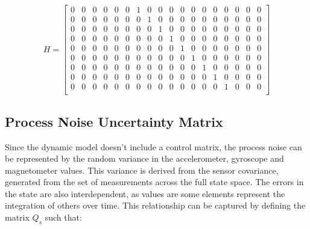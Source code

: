 \documentclass[12pt]{article}
\begin{document}
\begin{equation}
    H  = \begin{bmatrix}
        0 & 0 & 0 & 0 & 0 & 0 & 1 & 0 & 0 & 0 & 0 & 0 & 0 & 0 & 0 & 0 & 0 & 0 \\
        0 & 0 & 0 & 0 & 0 & 0 & 0 & 1 & 0 & 0 & 0 & 0 & 0 & 0 & 0 & 0 & 0 & 0  \\
        0 & 0 & 0 & 0 & 0 & 0 & 0 & 0 & 1 & 0 & 0 & 0 & 0 & 0 & 0 & 0 & 0 & 0  \\
        0 & 0 & 0 & 0 & 0 & 0 & 0 & 0 & 0 & 1 & 0 & 0 & 0 & 0 & 0 & 0 & 0 & 0  \\
        0 & 0 & 0 & 0 & 0 & 0 & 0 & 0 & 0 & 0 & 1 & 0 & 0 & 0 & 0 & 0 & 0 & 0  \\
        0 & 0 & 0 & 0 & 0 & 0 & 0 & 0 & 0 & 0 & 0 & 1 & 0 & 0 & 0 & 0 & 0 & 0  \\
        0 & 0 & 0 & 0 & 0 & 0 & 0 & 0 & 0 & 0 & 0 & 0 & 1 & 0 & 0 & 0 & 0 & 0  \\
        0 & 0 & 0 & 0 & 0 & 0 & 0 & 0 & 0 & 0 & 0 & 0 & 0 & 1 & 0 & 0 & 0 & 0  \\
        0 & 0 & 0 & 0 & 0 & 0 & 0 & 0 & 0 & 0 & 0 & 0 & 0 & 0 & 1 & 0 & 0 & 0  \\

\end{bmatrix} 
\end{equation}

\subsection{Process Noise Uncertainty Matrix}
Since the dynamic model doesn't include a control matrix, the process noise can be represented by the random variance in the accelerometer, gyroscope and magnetometer values.  This variance is derived from the sensor covariance, generated from the set of measurements across the full state space. The errors in the state are also interdependent, as values are some elements represent the integration of others over time. This relationship can be captured by defining the matrix $Q_s$ such that:
\end{document}
